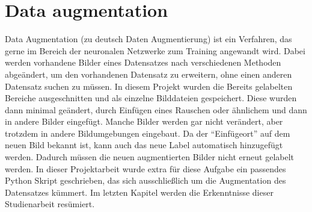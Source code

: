 \documentclass[a4paper,oneside,12pt]{report}
\begin{document}
	\chapter{Data augmentation}
	\begin{onehalfspace}
		Data Augmentation (zu deutsch Daten Augmentierung) ist ein Verfahren, das gerne im Bereich der neuronalen Netzwerke zum Training angewandt wird. Dabei werden vorhandene Bilder eines Datensatzes nach verschiedenen Methoden abgeändert, um den vorhandenen Datensatz zu erweitern, ohne einen anderen Datensatz suchen zu müssen. In diesem Projekt wurden die Bereits gelabelten Bereiche ausgeschnitten und als einzelne Bilddateien gespeichert. Diese wurden dann minimal geändert, durch Einfügen eines Rauschen oder ähnlichem und dann in andere Bilder eingefügt. Manche Bilder werden gar nicht verändert, aber trotzdem in andere Bildumgebungen eingebaut. Da der "`Einfügeort"' auf dem neuen Bild bekannt ist, kann auch das neue Label automatisch hinzugefügt werden. Dadurch müssen die neuen augmentierten Bilder nicht erneut gelabelt werden. In dieser Projektarbeit wurde extra für diese Aufgabe ein passendes Python Skript geschrieben, das sich ausschließlich um die Augmentation des Datensatzes kümmert. Im letzten Kapitel werden die Erkenntnisse dieser Studienarbeit resümiert.
	\end{onehalfspace}
\end{document}

